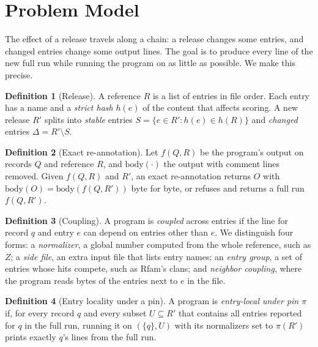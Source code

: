 \documentclass[letterpaper,twocolumn,10pt]{article}
\theoremstyle{definition}
\newtheorem{definition}{Definition}
\begin{document}
\section{Problem Model}
\label{sec:model}

The effect of a release travels along a chain: a release changes some entries, and changed entries change some
output lines. The goal is to produce every line of the new full run while running the program on as little as
possible. We make this precise.

\begin{definition}[Release]
A reference $R$ is a list of entries in file order. Each entry has a name and a \textit{strict hash} $h(e)$ of the
content that affects scoring. A new release $R'$ splits into \textit{stable} entries
$S = \{e \in R' : h(e) \in h(R)\}$ and \textit{changed} entries $\Delta = R' \setminus S$.
\end{definition}

\begin{definition}[Exact re-annotation]
Let $f(Q,R)$ be the program's output on records $Q$ and reference $R$, and $\mathrm{body}(\cdot)$ the output with
comment lines removed. Given $f(Q,R)$ and $R'$, an exact re-annotation returns $O$ with
$\mathrm{body}(O) = \mathrm{body}(f(Q,R'))$ byte for byte, or refuses and returns a full run $f(Q,R')$.
\end{definition}

\begin{definition}[Coupling]
A program is \textit{coupled} across entries if the line for record $q$ and entry $e$ can depend on entries other
than $e$. We distinguish four forms: a \textit{normalizer}, a global number computed from the whole reference, such as
$Z$; a \textit{side file}, an extra input file that lists entry names; an \textit{entry group}, a set of entries whose
hits compete, such as Rfam's clans; and \textit{neighbor coupling}, where the program reads bytes of the entries
next to $e$ in the file.
\end{definition}

\begin{definition}[Entry locality under a pin]
A program is \textit{entry-local under pin $\pi$} if, for every record $q$ and every subset $U \subseteq R'$ that
contains all entries reported for $q$ in the full run, running it on $(\{q\},U)$ with its normalizers set to $\pi(R')$
prints exactly $q$'s lines from the full run.
\end{definition}
\end{document}
